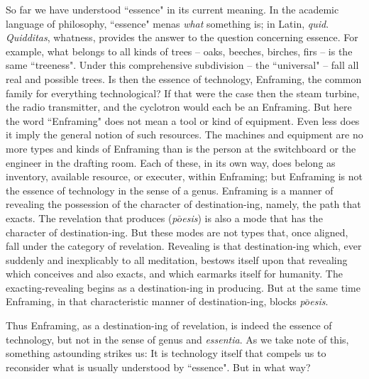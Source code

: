 \documentclass[paper=a4, fontsize=11pt,twoside]{scrartcl}
\begin{document}
So far we have understood ``essence" in its current meaning. In the academic language of philosophy, ``essence" menas \textit{what} something is; in Latin, \textit{quid}. \textit{Quidditas}, whatness, provides the answer to the question concerning essence. For example, what belongs to all kinds of trees -- oaks, beeches, birches, firs -- is the same ``treeness". Under this comprehensive subdivision -- the ``universal" -- fall all real and possible trees. Is then the essence of technology, Enframing, the common family for everything technological? If that were the case then the steam turbine, the radio transmitter, and the cyclotron would each be an Enframing. But here the word ``Enframing" does not mean a tool or kind of equipment. Even less does it imply the general notion of such resources. The machines and equipment are no more types and kinds of Enframing than is the person at the switchboard or the engineer in the drafting room. Each of these, in its own way, does belong as inventory, available resource, or executer, within Enframing; but Enframing is not the essence of technology in the sense of a genus. Enframing is a manner of revealing the possession of the character of destination-ing, namely, the path that exacts. The revelation that produces (\textit{p$\bar{o}$esis}) is also a mode that has the character of destination-ing. But these modes are not types that, once aligned, fall under the category of revelation. Revealing is that destination-ing which, ever suddenly and inexplicably to all meditation, bestows itself upon that revealing which conceives and also exacts, and which earmarks itself for humanity. The exacting-revealing begins as a destination-ing in producing. But at the same time Enframing, in that characteristic manner of destination-ing, blocks \textit{p$\bar{o}$esis}.

Thus Enframing, as a destination-ing of revelation, is indeed the essence of technology, but not in the sense of genus and \textit{essentia}. As we take note of this, something astounding strikes us: It is technology itself that compels us to reconsider what is usually understood by ``essence". But in what way?
\end{document}
